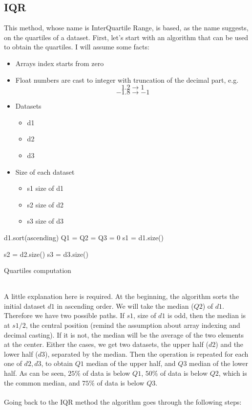 \documentclass[12pt]{report}
\begin{document}
\subsection{IQR}
This method, whose name is InterQuartile Range, is based, as the name suggests, on the quartiles of a dataset. First, let's start with an algorithm that can be used to obtain the quartiles. I will assume some facts:
\begin{itemize}
    \item Arrays index starts from zero
    \item Float numbers are cast to integer with truncation of the decimal part, e.g.
    $$1.2 \to 1$$
    $$-1.8 \to -1$$
    \item Datasets
    \begin{itemize}
        \item d1
        \item d2
        \item d3
    \end{itemize}
    \item Size of each dataset
    \begin{itemize}
        \item s1
        \subitem size of d1
        \item s2
        \subitem size of d2
        \item s3
        \subitem size of d3
    \end{itemize}
\end{itemize}

\begin{algorithm}[H]
\SetAlgoLined
{}
d1.sort(ascending)\;
Q1 = Q2 = Q3 = 0\;
s1 = d1.size()\;

s2 = d2.size()\;
s3 = d3.size()\;
 \caption{Quartiles computation}
\end{algorithm}
\noindent \\A little explanation here is required. At the beginning, the algorithm sorts the initial dataset $d1$ in ascending order. We will take the median ($Q2$) of $d1$. Therefore we have two possible paths. If $s1$, size of $d1$ is odd, then the median is at $s1/2$, the central position (remind the assumption about array indexing and decimal casting). If it is not, the median will be the average of the two elements at the center. Either the cases, we get two datasets, the upper half ($d2$) and the lower half ($d3$), separated by the median. Then the operation is repeated for each one of $d2,d3$, to obtain $Q1$ median of the upper half, and $Q3$ median of the lower half. As can be seen, $25\%$ of data is below $Q1$, $50\%$ of data is below $Q2$, which is the common median, and $75\%$ of data is below $Q3$. \\\\Going back to the IQR method the algorithm goes through the following steps:
\end{document}
